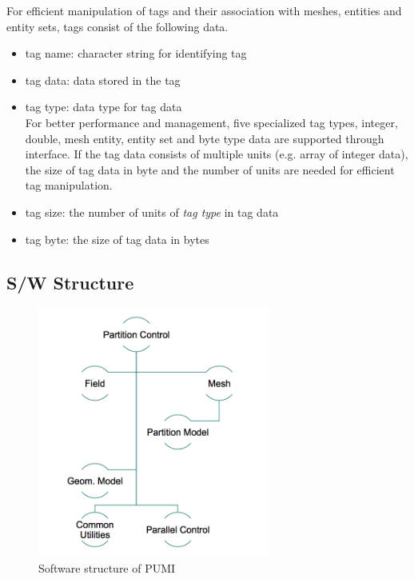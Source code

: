 For efficient manipulation of tags and their association with meshes, entities and entity sets, tags consist of the following data.
\begin{itemize}
\item{tag name}: character string for identifying tag
\item{tag data}: data stored in the tag
\item{tag type}: data type for tag data \\
For better performance and management, five specialized tag types, integer, double, mesh entity, entity set and byte type data are supported through interface. If the tag data consists of multiple units (e.g. array of integer data), the size of tag data in byte and  the number of units are needed for efficient tag manipulation.
\item{tag size}: the number of units of \emph{tag type} in tag data
\item{tag byte}: the size of tag data in bytes
\end{itemize}

\subsection{S/W Structure}

\begin{figure}[!t]
\centering
\includegraphics[width=3in]{fig/pumi.jpg} 
\caption{Software structure of PUMI}
\label{fig:pumi}
\end{figure}

